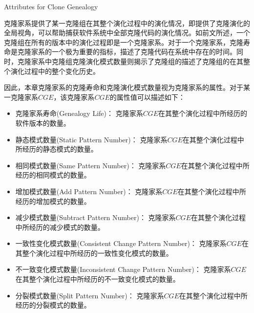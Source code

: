 {Attributes for Clone Genealogy}

克隆家系提供了某一克隆组在其整个演化过程中的演化情况，即提供了克隆演化的全局视角，可以帮助捕获软件系统中全部克隆代码的演化情况。如前文所述，一个克隆组在所有的版本中的演化过程即是一个克隆家系。对于一个克隆家系，克隆寿命是克隆家系的一个极为重要的指标，描述了克隆代码在系统中存在的时间。同时，克隆家系中克隆组克隆演化模式数量则揭示了克隆组的描述了克隆组的在其整个演化过程中的整个变化历史。

因此，本章克隆家系的克隆寿命和克隆演化模式数量视为克隆家系的属性。对于某一克隆家系{$CGE$}，该克隆家系{$CGE$}的属性值可以描述如下：

\begin{itemize}
\item
克隆家系寿命(Genealogy  Life)：
克隆家系{$CGE$}在其整个演化过程中所经历的软件版本的数量。
\item
静态模式数量(Static Pattern Number)：
克隆家系{$CGE$}在其整个演化过程中所经历的静态模式的数量。
\item
相同模式数量(Same Pattern Number)：
克隆家系{$CGE$}在其整个演化过程中所经历的相同模式的数量。
\item
增加模式数量(Add Pattern Number)：
克隆家系{$CGE$}在其整个演化过程中所经历的增加模式的数量。
\item
减少模式数量(Subtract Pattern Number)：
克隆家系{$CGE$}在其整个演化过程中所经历的减少模式的数量。
\item
一致性变化模式数量(Consistent Change Pattern Number)：
克隆家系{$CGE$}在其整个演化过程中所经历的一致性变化模式的数量。
\item
不一致变化模式数量(Inconsistent Change Pattern Number)：
克隆家系{$CGE$}在其整个演化过程中所经历的不一致变化模式的数量。
\item
分裂模式数量(Split Pattern Number)：
克隆家系{$CGE$}在其整个演化过程中所经历的分裂模式的数量。
\end{itemize}

